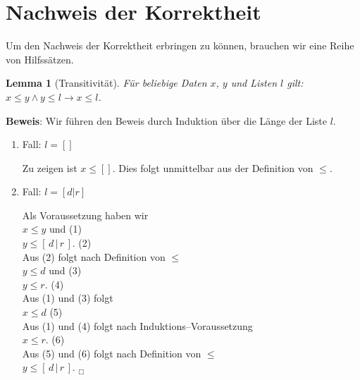 \documentclass{article}
\newtheorem{Lemma}[Definition]{Lemma}
\begin{document}
\section{Nachweis der Korrektheit}
Um den Nachweis der Korrektheit erbringen zu k\"onnen, brauchen wir eine Reihe von
Hilfss\"atzen.
\begin{Lemma}[Transitivit\"at] \label{l1}
F\"ur beliebige Daten $x$, $y$ und Listen $l$ gilt: \\[0.1cm]
\hspace*{1.3cm} $x \leq y \wedge y \leq l \rightarrow x \leq l$.
\end{Lemma}
\textbf{Beweis}:  Wir f\"uhren den Beweis durch Induktion \"uber die L\"ange der Liste $l$.
\begin{enumerate}
\item Fall: $l = []$

      Zu zeigen ist $x \leq []$. Dies folgt unmittelbar aus der Definition von $\leq$.
\item Fall: $l = [d|r]$

      Als Voraussetzung haben wir \\[0.1cm]
      \hspace*{1.3cm} $x \leq y$ \quad und \hspace*{\fill} (1) \\[0.1cm]
      \hspace*{1.3cm} $y \leq [\,d\,|\,r\,]$. \hspace*{\fill} (2) \\[0.1cm]
      Aus (2) folgt nach Definition von $\leq$ \\[0.1cm]
      \hspace*{1.3cm} $y \leq d$ \quad und \hspace*{\fill} (3) \\[0.1cm]
      \hspace*{1.3cm} $y \leq r$. \hspace*{\fill} (4) \\[0.1cm]
      Aus (1) und (3) folgt \\[0.1cm]
      \hspace*{1.3cm} $x \leq d$ \hspace*{\fill} (5) \\[0.1cm]
      Aus (1) und (4) folgt nach Induktions--Voraussetzung \\[0.1cm]
      \hspace*{1.3cm} $x \leq r$. \hspace*{\fill} (6) \\[0.1cm]
      Aus (5) und (6) folgt nach Definition von $\leq$ \\[0.1cm]
      \hspace*{1.3cm} $y \leq [\,d\,|\,r\,]$. \hspace*{\fill} $_\Box$ \\[0.1cm]
\end{enumerate}
\end{document}
